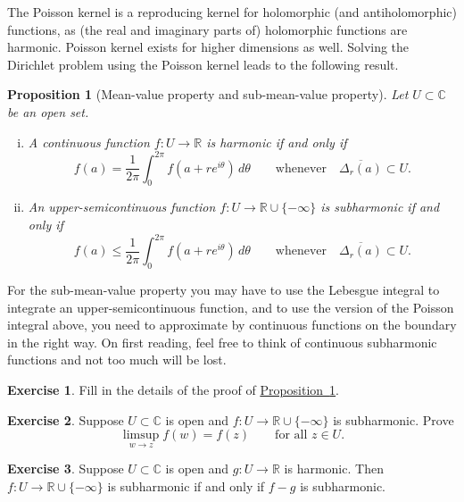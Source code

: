 \documentclass[12pt,openany]{book}
\newcommand{\C}{{\mathbb{C}}}
\newcommand{\R}{{\mathbb{R}}}
\theoremstyle{plain}
\newtheorem{prop}[thm]{Proposition}
\theoremstyle{remark}
\theoremstyle{definition}
\newenvironment{exbox}{%
    \def\FrameCommand{\vrule width 1pt \relax\hspace{10pt}}%
    \MakeFramed{\advance\hsize-\width\FrameRestore}%
}{%
    \endMakeFramed
}
\theoremstyle{exercise}
\newtheorem{exercise}{Exercise}[section]
\theoremstyle{example}
\newcommand{\propref}[1]{\hyperref[#1]{Proposition~\ref*{#1}}}
\begin{document}
The Poisson kernel is a reproducing kernel for
holomorphic (and antiholomorphic) functions, as (the real and imaginary parts of) holomorphic functions are harmonic.
Poisson kernel exists for higher dimensions as well.
Solving the Dirichlet problem using the Poisson kernel leads to
the following result.

\begin{prop}[Mean-value property and sub-mean-value property]
\pagebreak[2]%
\label{prop:meansubmeanprop}%
%
%
Let $U \subset \C$ be an open set.
\begin{enumerate}[(i)]
\item
A continuous function
$f \colon U \to \R$
is harmonic if and only if
\begin{equation*}
f(a) = \frac{1}{2\pi} \int_0^{2\pi} f(a+re^{i\theta})\, d\theta
\qquad \text{whenever} \quad
\overline{\Delta_r(a)} \subset U .
\end{equation*}
\item
An upper-semicontinuous function $f \colon U \to \R \cup \{ -\infty \}$
is subharmonic if and only if
\begin{equation*}
f(a) \leq \frac{1}{2\pi} \int_0^{2\pi} f(a+re^{i\theta})\, d\theta
\qquad \text{whenever} \quad
\overline{\Delta_r(a)} \subset U .
\end{equation*}
\end{enumerate}
\end{prop}

For the sub-mean-value property you may have to use
the Lebesgue integral to integrate an upper-semicontinuous function,
and to use the version of the Poisson integral above, you need to
approximate by continuous functions on the boundary in the right way.
On first reading, feel free to think of continuous subharmonic
functions and not too much will be lost.

\begin{exbox}
\begin{exercise}
Fill in the details of the proof of \propref{prop:meansubmeanprop}.
\end{exercise}

\begin{exercise} \label{exercise:limsupsubharmonic}
Suppose $U \subset \C$ is open and
$f \colon U \to \R \cup\{- \infty \}$ is subharmonic.  Prove
\begin{equation*}
\limsup_{w \to z} f(w) = f(z)
\qquad \text{for all $z \in U$.}
\end{equation*}
\end{exercise}

\begin{exercise} \label{exercise:fminusgsubharmonic}
Suppose $U \subset \C$ is open and $g \colon U \to \R$ is harmonic.
Then $f \colon U \to \R \cup \{ -\infty \}$ is subharmonic if and only if $f-g$
is subharmonic.
\end{exercise}
\end{exbox}
\end{document}
